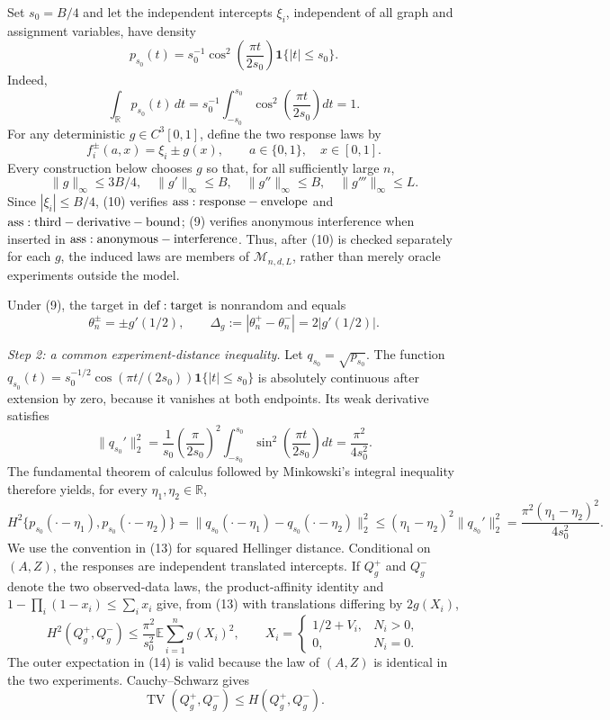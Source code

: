 Set \(s_0=B/4\) and let the independent intercepts \(\xi_i\), independent of all graph and assignment variables, have density
\[
p_{s_0}(t)=s_0^{-1}\cos^2\!\left(\frac{\pi t}{2s_0}\right)\mathbf 1\{|t|\leq s_0\}.
\tag{8}
\]
Indeed,
\[
 \int_{\mathbb R}p_{s_0}(t)\,dt
 =s_0^{-1}\int_{-s_0}^{s_0}\cos^2\!\left(\frac{\pi t}{2s_0}\right)dt=1.
\]
For any deterministic \(g\in C^3[0,1]\), define the two response laws by
\[
 f_i^\pm(a,x)=\xi_i\pm g(x),
 \qquad a\in\{0,1\},\quad x\in[0,1].
\tag{9}
\]
Every construction below chooses \(g\) so that, for all sufficiently large \(n\),
\[
 \|g\|_\infty\leq3B/4,
 \quad \|g'\|_\infty\leq B,
 \quad \|g''\|_\infty\leq B,
 \quad \|g'''\|_\infty\leq L.
\tag{10}
\]
Since \(|\xi_i|\leq B/4\), (10) verifies \({\rm ass:response-envelope}\) and \({\rm ass:third-derivative-bound}\); (9) verifies anonymous interference when inserted in \({\rm ass:anonymous-interference}\).  Thus, after (10) is checked separately for each \(g\), the induced laws are members of \(\mathcal M_{n,d,L}\), rather than merely oracle experiments outside the model.

Under (9), the target in \({\rm def:target}\) is nonrandom and equals
\[
 \theta_n^\pm=\pm g'(1/2),
 \qquad
 \Delta_g:=|\theta_n^+-\theta_n^-|=2|g'(1/2)|.
\tag{11}
\]

\textit{Step 2: a common experiment-distance inequality.}
Let \(q_{s_0}=\sqrt{p_{s_0}}\).  The function \(q_{s_0}(t)=s_0^{-1/2}\cos(\pi t/(2s_0))\mathbf 1\{|t|\leq s_0\}\) is absolutely continuous after extension by zero, because it vanishes at both endpoints.  Its weak derivative satisfies
\[
 \|q_{s_0}'\|_2^2
 =\frac1{s_0}\left(\frac{\pi}{2s_0}\right)^2
 \int_{-s_0}^{s_0}\sin^2\!\left(\frac{\pi t}{2s_0}\right)dt
 =\frac{\pi^2}{4s_0^2}.
\tag{12}
\]
The fundamental theorem of calculus followed by Minkowski's integral inequality therefore yields, for every \(\eta_1,\eta_2\in\mathbb R\),
\[
 H^2\{p_{s_0}(\mathord\cdot-\eta_1),p_{s_0}(\mathord\cdot-\eta_2)\}
 =\|q_{s_0}(\mathord\cdot-\eta_1)-q_{s_0}(\mathord\cdot-\eta_2)\|_2^2
 \leq(\eta_1-\eta_2)^2\|q_{s_0}'\|_2^2
 =\frac{\pi^2(\eta_1-\eta_2)^2}{4s_0^2}.
\tag{13}
\]
We use the convention in (13) for squared Hellinger distance.  Conditional on \((A,Z)\), the responses are independent translated intercepts.  If \(Q_g^+\) and \(Q_g^-\) denote the two observed-data laws, the product-affinity identity and \(1-\prod_i(1-x_i)\leq\sum_i x_i\) give, from (13) with translations differing by \(2g(X_i)\),
\[
 H^2(Q_g^+,Q_g^-)
 \leq\frac{\pi^2}{s_0^2}\mathbb E\sum_{i=1}^ng(X_i)^2,
 \qquad
 X_i=\begin{cases}1/2+V_i,&N_i>0,\\0,&N_i=0.\end{cases}
\tag{14}
\]
The outer expectation in (14) is valid because the law of \((A,Z)\) is identical in the two experiments.  Cauchy--Schwarz gives
\[
 \operatorname{TV}(Q_g^+,Q_g^-)
 \leq H(Q_g^+,Q_g^-).
\tag{15}
\]

